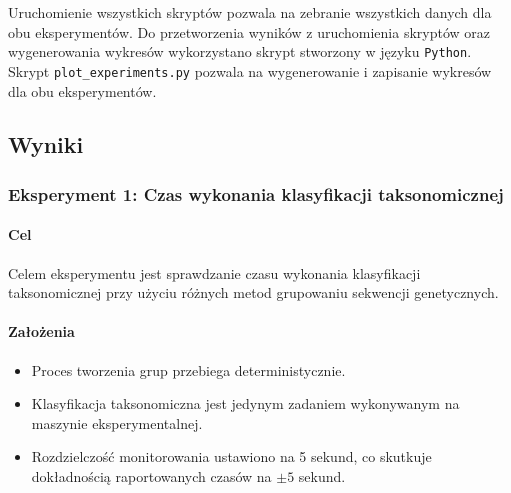             Uruchomienie wszystkich skryptów pozwala na zebranie wszystkich danych dla obu eksperymentów. Do przetworzenia wyników z uruchomienia skryptów oraz wygenerowania wykresów wykorzystano skrypt stworzony w języku \texttt{Python}. Skrypt \texttt{plot\_experiments.py} pozwala na wygenerowanie i zapisanie wykresów dla obu eksperymentów.

    \subsection{Wyniki}

        \subsubsection{Eksperyment 1: Czas wykonania klasyfikacji taksonomicznej}

            \paragraph{Cel}
                Celem eksperymentu jest sprawdzanie czasu wykonania klasyfikacji taksonomicznej przy użyciu różnych metod grupowaniu sekwencji genetycznych. 

            \paragraph{Założenia}
                \begin{itemize}
                    \item {
                        Proces tworzenia grup przebiega deterministycznie.
                    }
                    \item {
                        Klasyfikacja taksonomiczna jest jedynym zadaniem wykonywanym na maszynie eksperymentalnej.
                    }
                    \item {
                        Rozdzielczość monitorowania ustawiono na 5 sekund, co skutkuje dokładnością raportowanych czasów na $\pm 5$ sekund.
                    }
                \end{itemize}

